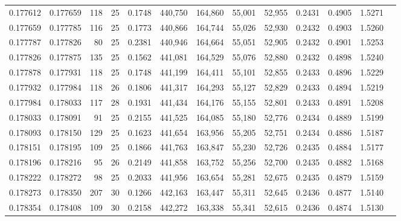 \begin{tabular}{rrrrrrrrrrrrr}
0.177612 & 0.177659 & 118 &  25 &                                     0.1748 & 440,750 & 164,860 &  55,001 &  52,955 & 0.2431 & 0.4905 & 1.5271 \\
0.177659 & 0.177785 & 116 &  25 &                                     0.1773 & 440,866 & 164,744 &  55,026 &  52,930 & 0.2432 & 0.4903 & 1.5260 \\
0.177787 & 0.177826 &  80 &  25 &                                     0.2381 & 440,946 & 164,664 &  55,051 &  52,905 & 0.2432 & 0.4901 & 1.5253 \\
0.177826 & 0.177875 & 135 &  25 &                                     0.1562 & 441,081 & 164,529 &  55,076 &  52,880 & 0.2432 & 0.4898 & 1.5240 \\
0.177878 & 0.177931 & 118 &  25 &                                     0.1748 & 441,199 & 164,411 &  55,101 &  52,855 & 0.2433 & 0.4896 & 1.5229 \\
0.177932 & 0.177984 & 118 &  26 &                                     0.1806 & 441,317 & 164,293 &  55,127 &  52,829 & 0.2433 & 0.4894 & 1.5219 \\
0.177984 & 0.178033 & 117 &  28 &                                     0.1931 & 441,434 & 164,176 &  55,155 &  52,801 & 0.2433 & 0.4891 & 1.5208 \\
0.178033 & 0.178091 &  91 &  25 &                                     0.2155 & 441,525 & 164,085 &  55,180 &  52,776 & 0.2434 & 0.4889 & 1.5199 \\
0.178093 & 0.178150 & 129 &  25 &                                     0.1623 & 441,654 & 163,956 &  55,205 &  52,751 & 0.2434 & 0.4886 & 1.5187 \\
0.178151 & 0.178195 & 109 &  25 &                                     0.1866 & 441,763 & 163,847 &  55,230 &  52,726 & 0.2435 & 0.4884 & 1.5177 \\
0.178196 & 0.178216 &  95 &  26 &                                     0.2149 & 441,858 & 163,752 &  55,256 &  52,700 & 0.2435 & 0.4882 & 1.5168 \\
0.178222 & 0.178272 &  98 &  25 &                                     0.2033 & 441,956 & 163,654 &  55,281 &  52,675 & 0.2435 & 0.4879 & 1.5159 \\
0.178273 & 0.178350 & 207 &  30 &                                     0.1266 & 442,163 & 163,447 &  55,311 &  52,645 & 0.2436 & 0.4877 & 1.5140 \\
0.178354 & 0.178408 & 109 &  30 &                                     0.2158 & 442,272 & 163,338 &  55,341 &  52,615 & 0.2436 & 0.4874 & 1.5130 \\

\end{tabular}
